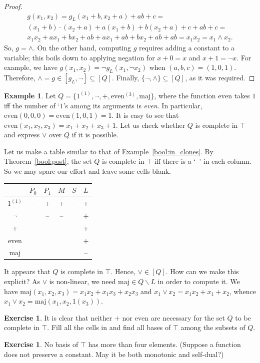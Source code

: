 \documentclass[12pt,notitlepage]{article}
\theoremstyle{plain}
\theoremstyle{definition}
\newtheorem{exc}[thm]{Exercise}
\newtheorem{exm}[thm]{Example}
\theoremstyle{plain}
\newcommand{\sbs}{\subseteq}
\renewcommand{\setminus}{\smallsetminus}
\newcommand{\1}{\mathbf{1}}
\newcommand{\0}{\mathbf{0}}
\begin{document}
\begin{proof}
\begin{multline*}
g(x_1, x_2) = g_L(x_1 + b, x_2 + a) + ab + c =\\
 (x_1 + b)\cdot(x_2 + a) + a(x_1 + b) + b(x_2 + a) + c + ab + c =\\
  x_1 x_2 + a x_1 + b x_2 + ab + a x_1 + ab + b x_2 + ab + ab =
 x_1 x_2 = x_1 \wedge x_2.
\end{multline*}
So, $g = {\wedge}$. On the other hand, computing $g$ requires adding a constant to a variable; this boils down to applying negation for $x + 0 = x$ and $x + 1 = \neg x$. For example, we have $g(x_1, x_2) = \neg g_L(x_1, \neg x_2)$ when $(a,b,c) = (1, 0, 1)$. Therefore, ${\wedge} = g \in [g_L, {\neg}] \sbs [Q]$. Finally, $\{{\neg}, {\wedge}\} \sbs [Q]$, as it was required.
\end{proof}

\begin{exm}
Let $Q = \{1^{(1)},{\neg},{+},\mathrm{even}^{(3)},\mathrm{maj}\}$, where the function $\mathrm{even}$ takes $1$ iff the number of `$1$'s among its arguments is \emph{even}. In particular, $\mathrm{even}(0, 0, 0) = \mathrm{even}(1, 0, 1) = 1$. It is easy to see that $\mathrm{even}(x_1,x_2,x_3) = x_1 + x_2 + x_3 +1$. Let us check whether $Q$ is complete in $\top$ and express $\vee$ over $Q$ if it is possible.

Let us make a table similar to that of Example~\ref{bool:in_clones}. By Theorem~\ref{bool:post}, the set $Q$ is complete in $\top$ iff there is a `--' in each column. So we may spare our effort and leave some cells blank.
\begin{center}
{\large
\begin{tabular}{|c|c|c|c|c|c|}
\hline
&$P_0$ & $P_1$ & $M$ & $S$ & $L$\\
\hline
$1^{(1)}$&--&+&+&--&+\\
\hline
$\neg$&&--&--&&+\\
\hline
$+$&&&&&+\\
\hline
$\mathrm{even}$&&&&&+\\
\hline
$\mathrm{maj}$&&&&&--\\
\hline
\end{tabular}
}
\end{center}
It appears that $Q$ is complete in $\top$. Hence, ${\vee} \in [Q]$. How can we make this explicit? As ${\vee}$ is non-linear, we need $\mathrm{maj} \in Q \setminus L$ in order to compute it. We have $\mathrm{maj}(x_1, x_2, x_3) = x_1 x_2 + x_1 x_3 + x_2 x_3$ and $x_1 \vee x_2 = x_1 x_2 + x_1 + x_2$, whence
$x_1 \vee x_2 = \mathrm{maj}(x_1,x_2,1(x_3))$.
\end{exm}
\begin{exc}
It is clear that neither ${+}$ nor $\mathrm{even}$ are necessary for the set $Q$ to be complete in $\top$. Fill all the cells in and find all bases of $\top$ among the subsets of $Q$.
\end{exc}
\begin{exc}
No basis of $\top$ has more than four elements. (Suppose a function does not preserve a constant. May it be both monotonic and self-dual?)
\end{exc}
\end{document}
